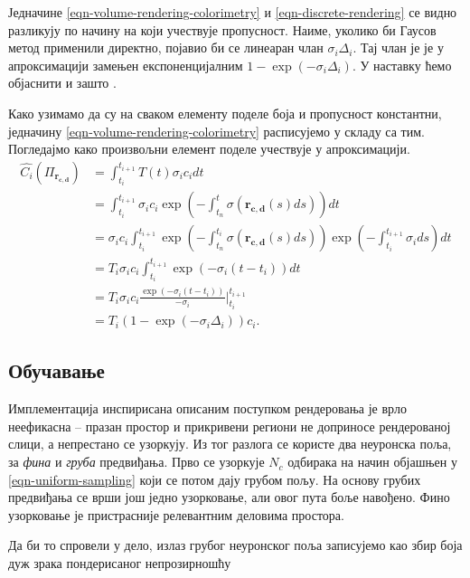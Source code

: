 \documentclass[12pt, a4paper, twoside]{book}
\numberwithin{equation}{chapter}
\numberwithin{theorem}{section}
\numberwithin{definition}{section}
\numberwithin{definitionChapter}{chapter}
\begin{document}
Једначине \ref{eqn-volume-rendering-colorimetry} и \ref{eqn-discrete-rendering} се видно разликују по
начину на који учествује пропусност. Наиме, уколико би Гаусов метод применили директно, појавио би се
линеаран члан $\sigma_i\Delta_i$. Тај члан је је у апроксимацији замењен експоненцијалним
$1 - \exp(-\sigma_i\Delta_i)$. У наставку ћемо објаснити и зашто \cite{volume-rendering}.

Како узимамо да су на сваком елементу поделе боја и пропусност константни,
једначину \ref{eqn-volume-rendering-colorimetry}  расписујемо у складу са тим. Погледајмо како
произвољни елемент поделе учествује у апроксимацији.
\begin{equation}
	\begin{split}
		\hat{C_i}(\Pi_{\mathbf{r_{c, d}}})
			& = \int_{t_i}^{t_{i + 1}} T(t)\sigma_i c_i dt \\
			& = \int_{t_i}^{t_{i + 1}} \sigma_i c_i \exp\left( -\int_{t_n}^{t} \sigma(\mathbf{r_{c, d}}(s)ds) \right)dt \\
			& = \sigma_i c_i \int_{t_i}^{t_{i + 1}} \exp\left( -\int_{t_n}^{t_i} \sigma(\mathbf{r_{c, d}}(s)ds) \right)
				\exp\left( -\int_{t_i}^{t_{i + 1}} \sigma_i ds \right) dt \\
			& = T_i \sigma_i c_i \int_{t_i}^{t_{i + 1}} \exp(-\sigma_i(t - t_i))dt \\
			& = T_i \sigma_i c_i \frac{\exp(-\sigma_i(t - t_i))}{-\sigma_i} \Biggr|_{t_i}^{t_{i + 1}} \\
			& = T_i (1 - \exp(-\sigma_i \Delta_i)) c_i.
	\end{split}
\end{equation}

\subsection{Обучавање}

Имплементација инспирисана описаним поступком рендеровања је врло неефикасна -- празан простор и прикривени
региони не доприносе рендерованој слици, а непрестано се узоркују. Из тог разлога се користе два неуронска поља,
за \textit{фина} и \textit{груба} предвиђања. Прво се узоркује $N_c$ одбирака на начин објашњен у
\ref{eqn-uniform-sampling} који се потом дају грубом пољу. На основу грубих предвиђања се врши још једно
узорковање, али овог пута боље навођено. Фино узорковање је пристрасније релевантним деловима простора.

Да би то спровели у дело, излаз грубог неуронског поља записујемо као збир боја дуж зрака пондерисаног
непрозирношћу
\end{document}
